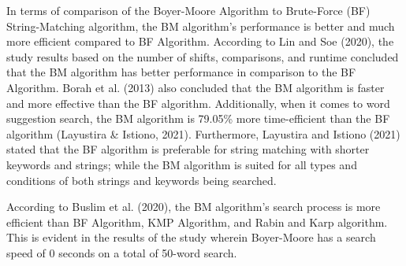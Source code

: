 \hfill

In terms of comparison of the Boyer-Moore Algorithm to Brute-Force (BF) String-Matching algorithm,
the BM algorithm’s performance is better and much more efficient compared to BF Algorithm. According
to Lin and Soe (2020), the study results based on the number of shifts, comparisons, and runtime
concluded that the BM algorithm has better performance in comparison to the BF Algorithm. Borah et
al. (2013) also concluded that the BM algorithm is faster and more effective than the BF algorithm.
Additionally, when it comes to word suggestion search, the BM algorithm is 79.05\% more time-efficient than the BF algorithm (Layustira \& Istiono, 2021). Furthermore, Layustira and Istiono (2021) stated that the BF algorithm is preferable for string matching with shorter keywords and strings; while the BM algorithm is suited for all types and conditions of both strings and keywords being searched. 

\hfill

According to Buslim et al. (2020), the BM algorithm’s search process is more efficient than BF Algorithm, KMP Algorithm, and Rabin and Karp algorithm. This is evident in the results of the study wherein Boyer-Moore has a search speed of 0 seconds on a total of 50-word search.
